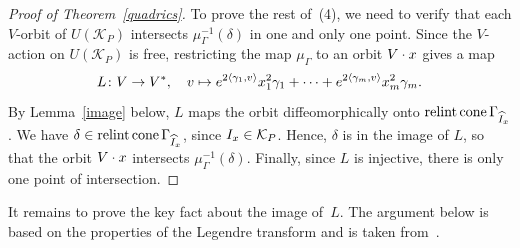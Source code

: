 \documentclass[a4paper]{amsart}
\theoremstyle{definition}
\theoremstyle{remark}
\numberwithin{equation}{section}
\def\sK{\mathcal K}
\newcommand{\mb}[1]{{\textbf {\textit#1}}}
\def\cone{\mathop{\mathrm{cone}}}
\def\relint{\mathop{\mathrm{relint}}}
\newcommand{\<}{\langle}
\renewcommand{\>}{\rangle}
\begin{document}
\begin{proof}[Proof of Theorem~\ref{quadrics}]
To prove the rest of~(4), we need to verify that each $V$-orbit of $U(\sK_P)$ intersects $\mu_\Gamma^{-1}(\delta)$ in one and only one point. Since the $V$-action on $U(\sK_P)$ is free, restricting the map $\mu_\Gamma$ to an orbit $V\cdot\mb x$ gives a map
\begin{equation}\label{Lmap}
  L\colon V\to V^*,\quad
  \mb v\mapsto e^{2\langle\gamma_1,\mb v\rangle}x_1^2\gamma_1+\cdots
  +e^{2\langle\gamma_m,\mb v\rangle}x_m^2\gamma_m.
\end{equation}
By Lemma~\ref{image} below, $L$ maps the orbit diffeomorphically onto $\relint\cone\Gamma_{\widehat I_{\mb x}}$. We have $\delta\in\relint\cone\Gamma_{\widehat I_{\mb x}}$, since $I_{\mb x}\in\sK_P$. Hence, $\delta$ is in the image of $L$, so that the orbit $V\cdot\mb x$ intersects $\mu_\Gamma^{-1}(\delta)$. Finally, since $L$ is injective, there is only one point of intersection.
\end{proof}

It remains to prove the key fact about the image of~$L$. The argument below is based on the properties of the Legendre transform and is taken from~\cite[Appendix~1]{guil94}.
\end{document}
